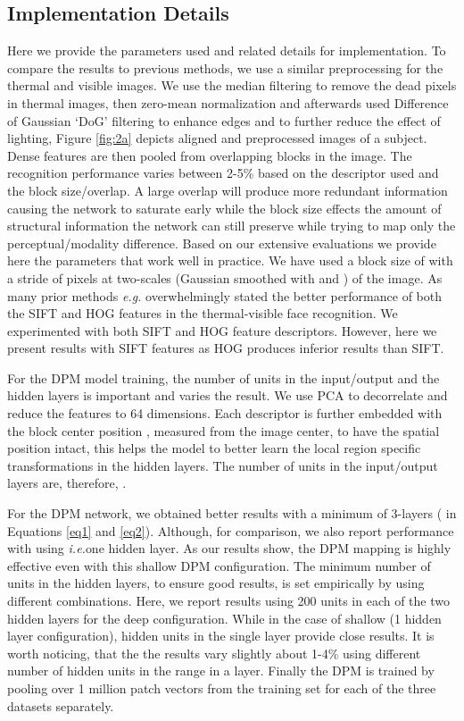 \documentclass[smallextended,natbib]{svjour3}       \usepackage{graphicx}
\newcommand{\ie}{\emph{i.e.}}
\newcommand{\eg}{\emph{e.g.}}
\begin{document}
\subsection{Implementation Details}
Here we provide the parameters used and related details for implementation. To compare the results to previous methods, we use a similar preprocessing for the thermal and visible images. We use the median filtering to remove the dead pixels in thermal images, then zero-mean normalization and afterwards used Difference of Gaussian `DoG' filtering to enhance edges and to further reduce the effect of lighting, Figure \ref{fig:2a} depicts aligned and preprocessed images of a subject. Dense features are then pooled from overlapping blocks in the image. The recognition performance varies between 2-5\% based on the descriptor used and the block size/overlap. A large overlap will produce more redundant information causing the network to saturate early while the block size effects the amount of structural information the network can still preserve while trying to map only the perceptual/modality difference. Based on our extensive evaluations we provide here the parameters that work well in practice. We have used a block size of  with a stride of  pixels at two-scales (Gaussian smoothed with  and ) of the image. As many prior methods \eg \cite{Klare13, hu2014, hu2015, choi2012} overwhelmingly stated the better performance of both the SIFT and HOG features in the thermal-visible face recognition. We experimented with both SIFT and HOG feature descriptors. However, here we present results with SIFT features as HOG produces  inferior results than SIFT.

For the DPM model training, the number of units in the input/output and the hidden layers is important and varies the result. We use PCA to decorrelate and reduce the features to 64 dimensions. Each descriptor is further embedded with the block center position , measured from the image center, to have the spatial position intact, this helps the model to better learn the local region specific transformations in the hidden layers. The number of units in the input/output layers are, therefore, .

For the DPM network, we obtained better results with a minimum of 3-layers ( in Equations \ref{eq1} and \ref{eq2}). Although, for comparison, we also report performance with using  \ie one hidden layer. As our results show, the DPM mapping is highly effective even with this shallow DPM configuration. The minimum number of units in the hidden layers,  to ensure good results, is set empirically by using different combinations. Here, we report results using 200 units in each of the two hidden layers for the deep configuration. While in the case of shallow (1 hidden layer configuration),  hidden units in the single layer provide close results. It is worth noticing, that the the results vary slightly about 1-4\% using different number of hidden units in the range  in a layer. Finally the DPM is trained by pooling over 1 million patch vectors from the training set for each of the three datasets separately.
\end{document}
